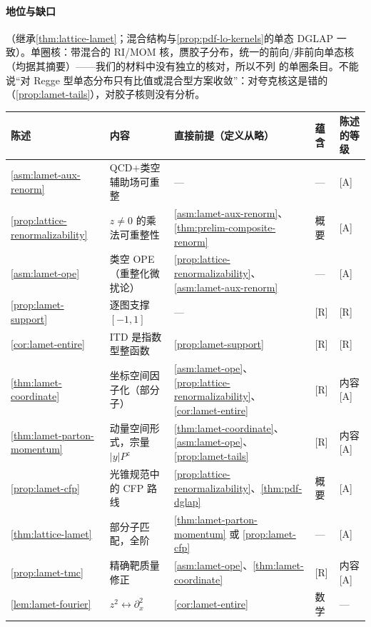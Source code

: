 \paragraph{地位与缺口}
\tagA（继承\cref{thm:lattice-lamet}；混合结构与\cref{prop:pdf-lo-kernels}的单态 DGLAP 一致）。单圈核：带混合的 RI/MOM 核\cite{Wang:2019tgg}，赝胶子分布\cite{Balitsky:2019krf}，统一的前向/非前向单态核\cite{Yao:2022vtp}（均据其摘要）——我们的材料中没有独立的核对，所以不列 \tagR 的单圈条目。不能说“对 Regge 型单态分布只有比值或混合型方案收敛”：对夸克核这是错的（\cref{prop:lamet-tails}），对胶子核则没有分析。

\begin{table}[htbp]
\centering
\footnotesize
\renewcommand{\arraystretch}{1.12}
\begin{tabularx}{\textwidth}{@{}p{2.25cm}Xp{3.6cm}p{0.95cm}p{1.75cm}@{}}
\toprule
陈述 & 内容 & 直接前提（定义从略） & 蕴含 & 陈述的等级 \\
\midrule
\cref{asm:lamet-aux-renorm} & QCD$+$类空辅助场可重整 & — & — & [A] \\
\cref{prop:lattice-renormalizability} & $z\neq0$ 的乘法可重整性 & \cref{asm:lamet-aux-renorm}、\cref{thm:prelim-composite-renorm} & 概要 & [A] \\
\cref{asm:lamet-ope} & 类空 OPE（重整化微扰论） & \cref{prop:lattice-renormalizability}、\cref{asm:lamet-aux-renorm} & — & [A] \\
\cref{prop:lamet-support} & 逐图支撑 $[-1,1]$ & — & [R] & [R] \\
\cref{cor:lamet-entire} & ITD 是指数型整函数 & \cref{prop:lamet-support} & [R] & [R] \\
\cref{thm:lamet-coordinate} & 坐标空间因子化（部分子） & \cref{asm:lamet-ope}、\cref{prop:lattice-renormalizability}、\cref{cor:lamet-entire} & [R] & 内容 [A] \\
\cref{thm:lamet-parton-momentum} & 动量空间形式，宗量 $|y|P^z$ & \cref{thm:lamet-coordinate}、\cref{asm:lamet-ope}、\cref{prop:lamet-tails} & [R] & 内容 [A] \\
\cref{prop:lamet-cfp} & 光锥规范中的 CFP 路线 & \cref{prop:lattice-renormalizability}、\cref{thm:pdf-dglap} & 概要 & [A] \\
\cref{thm:lattice-lamet} & 部分子匹配，全阶 & \cref{thm:lamet-parton-momentum} 或 \cref{prop:lamet-cfp} & — & [A] \\
\cref{prop:lamet-tmc} & 精确靶质量修正 & \cref{asm:lamet-ope}、\cref{thm:lamet-coordinate} & [R] & 内容 [A] \\
\cref{lem:lamet-fourier} & $z^2\leftrightarrow\partial_x^2$ & \cref{cor:lamet-entire} & 数学 & — \\

\end{tabularx}
\end{table}
